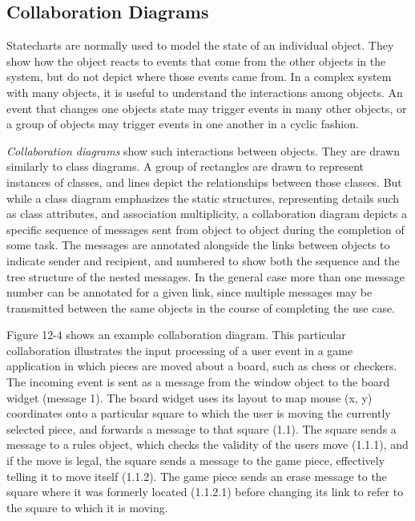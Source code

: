 \subsection{Collaboration Diagrams}

Statecharts are normally used to model the state of an individual
object. They show how the object reacts to events that come from the
other objects in the system, but do not depict where those events came
from. In a complex system with many objects, it is useful to understand
the interactions among objects. An event that changes one
object{\textquotesingle}s state may trigger events in many other
objects, or a group of objects may trigger events in one another in a
cyclic fashion.

\textit{Collaboration diagrams} show such
interactions between objects. They are drawn similarly to class
diagrams. A group of rectangles are drawn to represent
instances of classes, and lines depict the
relationships between those classes. But while a class diagram
emphasizes the static structures, representing details such as class
attributes, and association multiplicity, a collaboration diagram
depicts a specific sequence of messages sent from object to object
during the completion of some task. The messages are annotated
alongside the links between objects to indicate sender and recipient,
and numbered to show both the sequence and the tree
structure of the nested messages. In the general case more than one
message number can be annotated for a given link, since multiple messages may be transmitted between the
same objects in the course of completing the use case.

Figure 12-4 shows an example collaboration diagram. This particular
collaboration illustrates the input processing of a user event in a
game application in which pieces are moved about a board, such as chess
or checkers. The incoming event is sent as a message from the window
object to the board widget (message 1). The board widget uses its
layout to map mouse (x, y) coordinates onto a particular square to
which the user is moving the currently selected piece, and forwards a
message to that square (1.1). The square sends a message to a rules
object, which checks the validity of the user{\textquotesingle}s move
(1.1.1), and if the move is legal, the square sends a message to the
game piece, effectively telling it to move itself (1.1.2). The game
piece sends an {\textquotedbl}erase{\textquotedbl} message to the
square where it was formerly located (1.1.2.1) before changing its link
to refer to the square to which it is moving.

